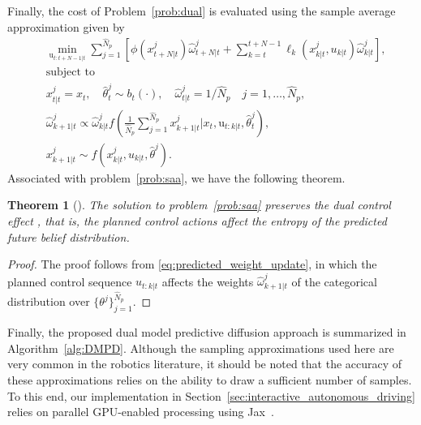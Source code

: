 \documentclass[letterpaper, 10 pt, conference]{IEEEconf}
\newtheorem{theorem}{Theorem}
\begin{document}
Finally, the cost of Problem~\eqref{prob:dual} is evaluated using the sample average approximation given by 
\begin{subequations} \label{prob:saa}
    \begin{align}
        & \min_{\mathrm{u}_{t:t+N-1|t}} \sum_{j=1}^{\hat{N}_p} \left[\phi(x_{t+N|t}^{j}) \hat{\omega}_{t+N|t}^{j} + \sum_{k=t}^{t+N-1} \ell_{k}(x_{k|t}^{j}, u_{k|t}) \hat{\omega}_{k|t}^{j} \right], \label{cost:saa} \\
        & \text{subject to} \nonumber\\
        & x_{t|t}^{j} = x_{t}, \quad \hat{\theta}^{j}_{t} \sim b_{t}(\cdot), \quad \hat{\omega}_{t|t}^{j} = 1/\hat{N}_p \quad j = 1, \dots, \hat{N}_p, \\
        & \hat{\omega}^{j}_{k+1|t} \propto \hat{\omega}^{j}_{k|t} f(\frac{1}{\hat{N}_p} \sum_{j=1}^{\hat{N}_{p}} x_{k+1|t}^{j} | x_{t}, \mathrm{u}_{t:k|t}, \hat{\theta}_{t}^{j}), \label{const:saa_weights} \\
        & x_{k+1|t}^{j} \sim f(x_{k|t}^{j}, u_{k|t}, \hat{\theta}^{j}). \label{const:saa_dynamics}
    \end{align}
\end{subequations}
Associated with problem~\eqref{prob:saa}, we have the following theorem.
\begin{theorem}[\cite{knaup2024active}]
    The solution to problem~\eqref{prob:saa} preserves the dual control effect \cite{hu2022active}, that is, the planned control actions affect the entropy of the predicted future belief distribution.
\end{theorem}
\begin{proof}
    The proof follows from \eqref{eq:predicted_weight_update}, in which the planned control sequence $u_{t:k|t}$ affects the weights $\hat{\omega}^{j}_{k+1|t}$ of the categorical distribution over $\{\theta^j\}_{j=1}^{\hat{N}_p}$.
\end{proof}

Finally, the proposed dual model predictive diffusion approach is summarized in Algorithm~\ref{alg:DMPD}.
Although the sampling approximations used here are very common in the robotics literature, it should be noted that the accuracy of these approximations relies on the ability to draw a sufficient number of samples.
To this end, our implementation in Section~\ref{sec:interactive_autonomous_driving} relies on parallel GPU-enabled processing using Jax~\cite{jax2018github}.
\end{document}
